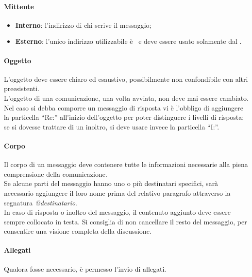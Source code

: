 \documentclass[../NormeDiProgetto.tex]{subfiles}
\begin{document}
					\paragraph{Mittente}
						\begin{itemize}
							\item \textbf{Interno}: l'indirizzo di chi scrive
							il messaggio;
							\item \textbf{Esterno}: l'unico indirizzo utilizzabile è
							\mailkaleidoscode\ e deve essere usato solamente dal
							\responsabilediprogetto.
						\end{itemize}
					\paragraph{Oggetto\\}
						L'oggetto deve essere chiaro ed esaustivo, possibilmente non
						confondibile con altri preesistenti.\\
						L'oggetto di una comunicazione, una volta avviata, non deve mai essere cambiato.\\
						Nel caso si debba comporre un messaggio di risposta vi è l'obbligo di aggiungere la
						particella ``Re:'' all'inizio dell'oggetto per poter distinguere i
						livelli di risposta; se si dovesse trattare di un inoltro, si deve
						usare invece la particella ``I:''.
					\paragraph{Corpo\\}
						Il corpo di un messaggio deve contenere tutte le informazioni
						necessarie alla piena comprensione della comunicazione.\\
						Se alcune parti del messaggio hanno uno o più destinatari specifici,
						sarà necessario aggiungere il loro nome	prima del relativo paragrafo
						attraverso la segnatura	\textit{@destinatario}.\\
						In caso di risposta o inoltro del messaggio, il contenuto aggiunto deve
						essere sempre collocato in testa.
						Si consiglia di non cancellare il resto del messaggio,
						per consentire una visione completa della discussione.
					\paragraph{Allegati\\}
						Qualora fosse necessario, è permesso l'invio di allegati.
\end{document}

